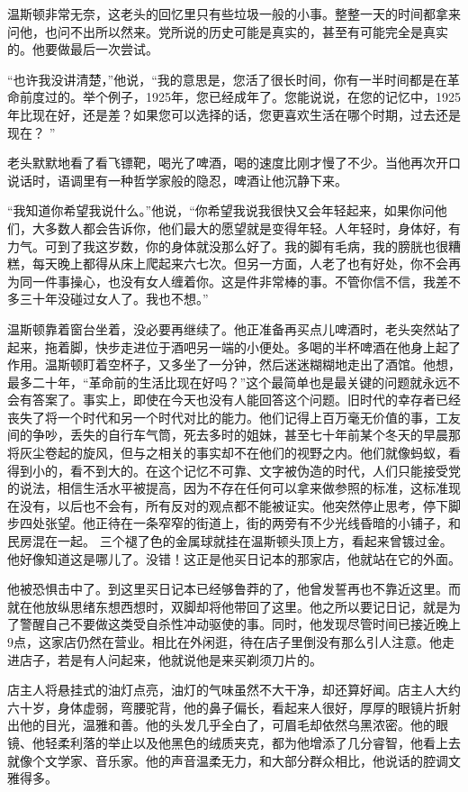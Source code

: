温斯顿非常无奈，这老头的回忆里只有些垃圾一般的小事。整整一天的时间都拿来问他，也问不出所以然来。党所说的历史可能是真实的，甚至有可能完全是真实的。他要做最后一次尝试。

``也许我没讲清楚，''他说，``我的意思是，您活了很长时间，你有一半时间都是在革命前度过的。举个例子，1925年，您已经成年了。您能说说，在您的记忆中，1925年比现在好，还是差？如果您可以选择的话，您更喜欢生活在哪个时期，过去还是现在？
''

老头默默地看了看飞镖靶，喝光了啤酒，喝的速度比刚才慢了不少。当他再次开口说话时，语调里有一种哲学家般的隐忍，啤酒让他沉静下来。

``我知道你希望我说什么。''他说，``你希望我说我很快又会年轻起来，如果你问他们，大多数人都会告诉你，他们最大的愿望就是变得年轻。人年轻时，身体好，有力气。可到了我这岁数，你的身体就没那么好了。我的脚有毛病，我的膀胱也很糟糕，每天晚上都得从床上爬起来六七次。但另一方面，人老了也有好处，你不会再为同一件事操心，也没有女人缠着你。这是件非常棒的事。不管你信不信，我差不多三十年没碰过女人了。我也不想。''

温斯顿靠着窗台坐着，没必要再继续了。他正准备再买点儿啤酒时，老头突然站了起来，拖着脚，快步走进位于酒吧另一端的小便处。多喝的半杯啤酒在他身上起了作用。温斯顿盯着空杯子，又多坐了一分钟，然后迷迷糊糊地走出了酒馆。他想，最多二十年，``革命前的生活比现在好吗？''这个最简单也是最关键的问题就永远不会有答案了。事实上，即使在今天也没有人能回答这个问题。旧时代的幸存者已经丧失了将一个时代和另一个时代对比的能力。他们记得上百万毫无价值的事，工友间的争吵，丢失的自行车气筒，死去多时的姐妹，甚至七十年前某个冬天的早晨那将灰尘卷起的旋风，但与之相关的事实却不在他们的视野之内。他们就像蚂蚁，看得到小的，看不到大的。在这个记忆不可靠、文字被伪造的时代，人们只能接受党的说法，相信生活水平被提高，因为不存在任何可以拿来做参照的标准，这标准现在没有，以后也不会有，所有反对的观点都不能被证实。他突然停止思考，停下脚步四处张望。他正待在一条窄窄的街道上，街的两旁有不少光线昏暗的小铺子，和民房混在一起。
三个褪了色的金属球就挂在温斯顿头顶上方，看起来曾镀过金。他好像知道这是哪儿了。没错！这正是他买日记本的那家店，他就站在它的外面。

他被恐惧击中了。到这里买日记本已经够鲁莽的了，他曾发誓再也不靠近这里。而就在他放纵思绪东想西想时，双脚却将他带回了这里。他之所以要记日记，就是为了警醒自己不要做这类受自杀性冲动驱使的事。同时，他发现尽管时间已接近晚上9点，这家店仍然在营业。相比在外闲逛，待在店子里倒没有那么引人注意。他走进店子，若是有人问起来，他就说他是来买剃须刀片的。

店主人将悬挂式的油灯点亮，油灯的气味虽然不大干净，却还算好闻。店主人大约六十岁，身体虚弱，弯腰驼背，他的鼻子偏长，看起来人很好，厚厚的眼镜片折射出他的目光，温雅和善。他的头发几乎全白了，可眉毛却依然乌黑浓密。他的眼镜、他轻柔利落的举止以及他黑色的绒质夹克，都为他增添了几分睿智，他看上去就像个文学家、音乐家。他的声音温柔无力，和大部分群众相比，他说话的腔调文雅得多。

